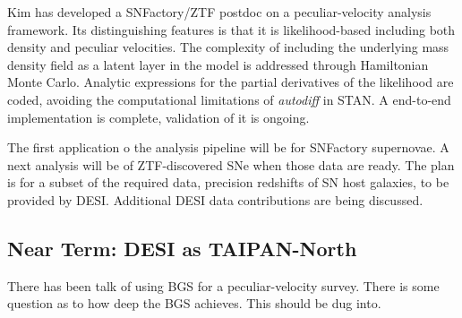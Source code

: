 \documentclass[11pt, oneside]{article}   	%
\begin{document}
Kim has developed a SNFactory/ZTF postdoc on a peculiar-velocity analysis framework.  Its distinguishing features is that it is likelihood-based
including both density and peculiar velocities.  The complexity of including the underlying mass density field as a latent layer in the model
is addressed through Hamiltonian Monte Carlo.  Analytic expressions for the partial derivatives of the likelihood are coded,
avoiding the computational limitations of {\it autodiff} in STAN.  A end-to-end implementation is complete, validation of it is ongoing.

The first application o the analysis pipeline will be for SNFactory supernovae.  A next analysis will be of ZTF-discovered 
SNe when those data are ready.  The plan is for a  subset of the required data, precision redshifts of SN host galaxies, to be provided
by DESI.  Additional DESI data contributions are being discussed.

\subsection{Near Term: DESI as TAIPAN-North}

There has been talk of using BGS for a peculiar-velocity survey.  There is some question as to how deep the BGS achieves.  This should be
dug into.
\end{document}
